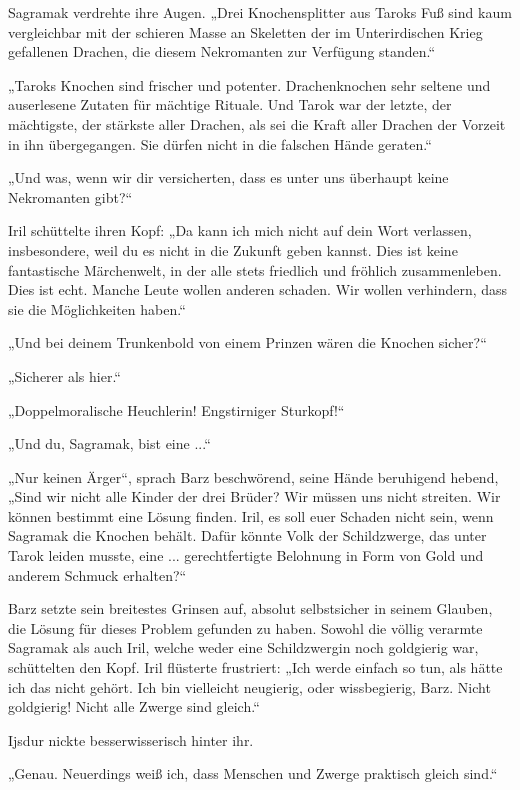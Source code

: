 Sagramak verdrehte ihre Augen. „Drei Knochensplitter aus Taroks Fuß sind kaum vergleichbar mit der schieren Masse an Skeletten der im Unterirdischen Krieg gefallenen Drachen, die diesem Nekromanten zur Verfügung standen.“

„Taroks Knochen sind frischer und potenter. Drachenknochen sehr seltene und auserlesene Zutaten für mächtige Rituale. Und Tarok war der letzte, der mächtigste, der stärkste aller Drachen, als sei die Kraft aller Drachen der Vorzeit in ihn übergegangen. Sie dürfen nicht in die falschen Hände geraten.“

„Und was, wenn wir dir versicherten, dass es unter uns überhaupt keine Nekromanten gibt?“

Iril schüttelte ihren Kopf: „Da kann ich mich nicht auf dein Wort verlassen, insbesondere, weil du es nicht in die Zukunft geben kannst. Dies ist keine fantastische Märchenwelt, in der alle stets friedlich und fröhlich zusammenleben. Dies ist echt. Manche Leute wollen anderen schaden. Wir wollen verhindern, dass sie die Möglichkeiten haben.“

„Und bei deinem Trunkenbold von einem Prinzen wären die Knochen sicher?“

„Sicherer als hier.“

„Doppelmoralische Heuchlerin! Engstirniger Sturkopf!“

„Und du, Sagramak, bist eine ...“

„Nur keinen Ärger“, sprach Barz beschwörend, seine Hände beruhigend hebend, „Sind wir nicht alle Kinder der drei Brüder? Wir müssen uns nicht streiten. Wir können bestimmt eine Lösung finden. Iril, es soll euer Schaden nicht sein, wenn Sagramak die Knochen behält. Dafür könnte Volk der Schildzwerge, das unter Tarok leiden musste, eine ... gerechtfertigte Belohnung in Form von Gold und anderem Schmuck erhalten?“

Barz setzte sein breitestes Grinsen auf, absolut selbstsicher in seinem Glauben, die Lösung für dieses Problem gefunden zu haben. Sowohl die völlig verarmte Sagramak als auch Iril, welche weder eine Schildzwergin noch goldgierig war, schüttelten den Kopf. Iril flüsterte frustriert: „Ich werde einfach so tun, als hätte ich das nicht gehört. Ich bin vielleicht neugierig, oder wissbegierig, Barz. Nicht goldgierig! Nicht alle Zwerge sind gleich.“

Ijsdur nickte besserwisserisch hinter ihr.

„Genau. Neuerdings weiß ich, dass Menschen und Zwerge praktisch gleich sind.“

